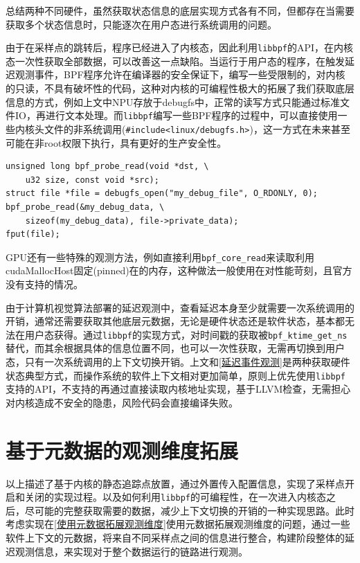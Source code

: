 \documentclass[master,anonymous]{shtthesis}
\begin{document}
总结两种不同硬件，虽然获取状态信息的底层实现方式各有不同，但都存在当需要获取多个状态信息时，只能逐次在用户态进行系统调用的问题。

由于在采样点的跳转后，程序已经进入了内核态，因此利用\verb*|libbpf|的API，在内核态一次性获取全部数据，可以改善这一点缺陷。当运行于用户态的程序，在触发延迟观测事件，BPF程序允许在编译器的安全保证下，编写一些受限制的，对内核的只读，不具有破坏性的代码，这种对内核的可编程性极大的拓展了我们获取底层信息的方式，例如上文中NPU存放于debugfs中，正常的读写方式只能通过标准文件IO，再进行文本处理。而\verb*|libbpf|编写一些BPF程序的过程中，可以直接使用一些内核头文件的非系统调用(\verb*|#include<linux/debugfs.h>|)，这一方式在未来甚至可能在非root权限下执行，具有更好的生产安全性。

\begin{lstlisting}[caption={使用非系统调用方式读取debugfs},captionpos=b]
unsigned long bpf_probe_read(void *dst, \
	u32 size, const void *src);
struct file *file = debugfs_open("my_debug_file", O_RDONLY, 0);
bpf_probe_read(&my_debug_data, \
	sizeof(my_debug_data), file->private_data);
fput(file);
\end{lstlisting}

GPU还有一些特殊的观测方法，例如直接利用\verb*|bpf_core_read|来读取利用cudaMallocHost固定(pinned)在的内存，这种做法一般使用在对性能苛刻，且官方没有支持的情况。

由于计算机视觉算法部署的延迟观测中，查看延迟本身至少就需要一次系统调用的开销，通常还需要获取其他底层元数据，无论是硬件状态还是软件状态，基本都无法在用户态获得。通过\verb*|libbpf|的实现方式，对时间戳的获取被\verb*|bpf_ktime_get_ns|替代，而其余根据具体的信息位置不同，也可以一次性获取，无需再切换到用户态，只有一次系统调用的上下文切换开销。上文和\ref{延迟事件观测}是两种获取硬件状态典型方式，而操作系统的软件上下文相对更加简单，原则上优先使用\verb*|libbpf|支持的API，不支持的再通过直接读取内核地址实现，基于LLVM检查，无需担心对内核造成不安全的隐患，风险代码会直接编译失败。


\section{基于元数据的观测维度拓展}\label{基于元数据的观测维度拓展}
以上描述了基于内核的静态追踪点放置，通过外置传入配置信息，实现了采样点开启和关闭的实现过程。以及如何利用\verb*|libbpf|的可编程性，在一次进入内核态之后，尽可能的完整获取需要的数据，减少上下文切换的开销的一种实现思路。此时考虑实现在\ref{使用元数据拓展观测维度}使用元数据拓展观测维度的问题，通过一些软件上下文的元数据，将来自不同采样点之间的信息进行整合，构建阶段整体的延迟观测信息，来实现对于整个数据运行的链路进行观测。
\end{document}
